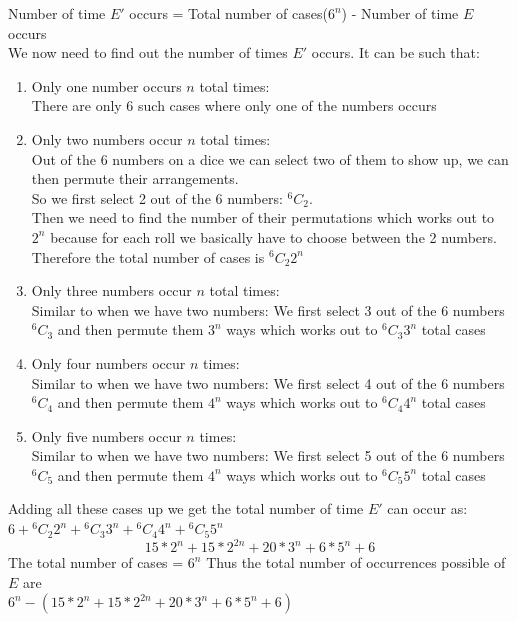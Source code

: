 \documentclass[10pt]{article}
\newcommand*{\Co}[2]{{}^{#1}C_{#2}}%
\newenvironment{solution}[2][Solution]{ \begin{trivlist}
\item[\hskip \labelsep {\bfseries #1}]}{\end{trivlist}}
\begin{document}
\begin{solution}{1}
\begin{enumerate}[label=(\alph*)]
    Number of time $E'$ occurs = Total number of cases($6^n$) - Number of time $E$ occurs\\
    We now need to find out the number of times $E'$ occurs. It can be such that:
    \begin{enumerate}[label=(\Roman*)]
    \parskip=0in
    \parsep=0in
    \itemsep=0.1in
    \item Only one number occurs $n$ total times:\\
        There are only 6 such cases where only one of the numbers occurs
    \item Only two numbers occur $n$ total times:\\
        Out of the 6 numbers on a dice we can select two of them to show up, we can then permute their arrangements.\\
        So we first select 2 out of the 6 numbers: $\Co{6}{2}$.\\
        Then we need to find the number of their permutations which works out to $2^n$ because for each roll we basically have to choose between the 2 numbers.\\
        Therefore the total number of cases is $\Co{6}{2} 2^n$
    \item Only three numbers occur $n$ total times:\\
        Similar to when we have two numbers: We first select 3 out of the 6 numbers $\Co{6}{3}$ and then permute them $3^n$ ways which works out to $\Co{6}{3} 3^n$ total cases
    \item Only four numbers occur $n$ times: \\
        Similar to when we have two numbers: We first select 4 out of the 6 numbers $\Co{6}{4}$ and then permute them $4^n$ ways which works out to $\Co{6}{4} 4^n$ total cases
    \item Only five numbers occur $n$ times:\\
        Similar to when we have two numbers: We first select 5 out of the 6 numbers $\Co{6}{5}$ and then permute them $4^n$ ways which works out to $\Co{6}{5} 5^n$ total cases
    \end{enumerate}
        Adding all these cases up we get the total number of time $E'$ can occur as: $6+\Co{6}{2} 2^n+\Co{6}{3} 3^n+\Co{6}{4} 4^n+\Co{6}{5} 5^n$\\
        $$ 15*2^n + 15*2^{2n} + 20*3^n + 6*5^n + 6 $$
    The total number of cases = $6^n$
    Thus the total number of occurrences possible of $E$ are \\$6^n - {(15*2^n + 15*2^{2n} + 20*3^n + 6*5^n + 6)}$\\

\end{enumerate}
\end{solution}
\end{document}
